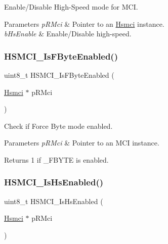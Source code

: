 Enable/\+Disable High-\/\+Speed mode for M\+CI. 


\begin{DoxyParams}{Parameters}
{\em p\+R\+Mci} & Pointer to an \mbox{\hyperlink{structHsmci}{Hsmci}} instance. \\
\hline
{\em b\+Hs\+Enable} & Enable/\+Disable high-\/speed. \\
\hline
\end{DoxyParams}
\mbox{\label{group__hsmci__functions_gad57fce98582202eca10f7911c75e34c3}} 
\subsubsection{\texorpdfstring{HSMCI\_IsFByteEnabled()}{HSMCI\_IsFByteEnabled()}}
{\footnotesize\ttfamily uint8\+\_\+t H\+S\+M\+C\+I\+\_\+\+Is\+F\+Byte\+Enabled (\begin{DoxyParamCaption}\item[{\mbox{\hyperlink{structHsmci}{Hsmci}} $\ast$}]{p\+R\+Mci }\end{DoxyParamCaption})}



Check if Force Byte mode enabled. 


\begin{DoxyParams}{Parameters}
{\em p\+R\+Mci} & Pointer to an M\+CI instance. \\
\hline
\end{DoxyParams}
\begin{DoxyReturn}{Returns}
1 if \+\_\+\+F\+B\+Y\+TE is enabled. 
\end{DoxyReturn}
\mbox{\label{group__hsmci__functions_gad4ba27f7339c9558b66aef5d9ebf6cab}} 
\subsubsection{\texorpdfstring{HSMCI\_IsHsEnabled()}{HSMCI\_IsHsEnabled()}}
{\footnotesize\ttfamily uint8\+\_\+t H\+S\+M\+C\+I\+\_\+\+Is\+Hs\+Enabled (\begin{DoxyParamCaption}\item[{\mbox{\hyperlink{structHsmci}{Hsmci}} $\ast$}]{p\+R\+Mci }\end{DoxyParamCaption})}



